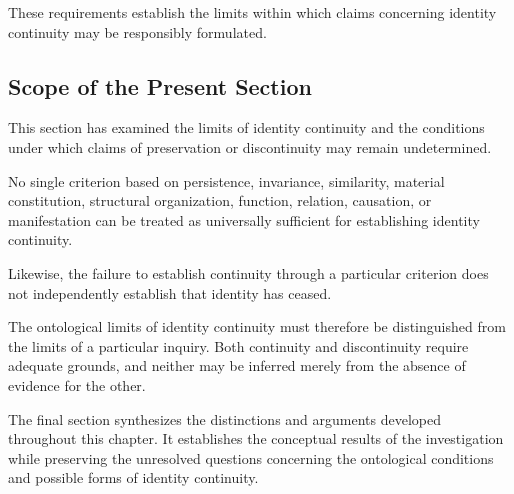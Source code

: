 These requirements establish the limits within
which claims concerning identity continuity
may be responsibly formulated.

\subsection{Scope of the Present Section}

This section has examined the limits of identity
continuity and the conditions under which claims
of preservation or discontinuity may remain
undetermined.

No single criterion based on persistence,
invariance, similarity, material constitution,
structural organization, function, relation,
causation, or manifestation can be treated as
universally sufficient for establishing identity
continuity.

Likewise, the failure to establish continuity
through a particular criterion does not independently
establish that identity has ceased.

The ontological limits of identity continuity
must therefore be distinguished from the limits
of a particular inquiry. Both continuity and
discontinuity require adequate grounds, and
neither may be inferred merely from the absence
of evidence for the other.

The final section synthesizes the distinctions
and arguments developed throughout this chapter.
It establishes the conceptual results of the
investigation while preserving the unresolved
questions concerning the ontological conditions
and possible forms of identity continuity.

